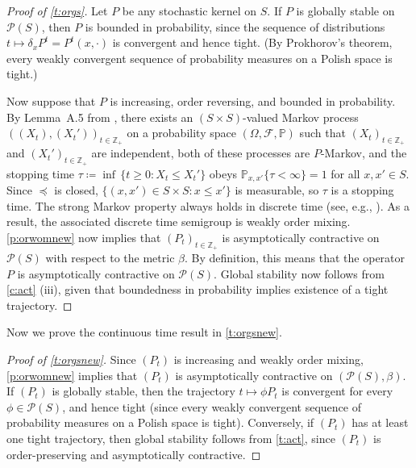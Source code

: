 \documentclass[12pt,reqno]{amsart}
\numberwithin{equation}{section}
\theoremstyle{definition}
\newcommand{\1}{\mathbbm{1}}
\newcommand{\ZZ}{\mathbb{Z}}
\newcommand{\PP}{\mathbb P}
\newcommand{\fF}{\mathcal{F}}
\newcommand{\pP}{\mathscr{P}}
\begin{document}
\begin{proof}[Proof of \cref{t:orgs}]
    Let $P$ be any stochastic kernel on $S$.
    If $P$ is globally stable on $\pP(S)$, then $P$ is bounded in probability, 
    since the sequence of distributions $t \mapsto \delta_x P^t = P^t(x, \cdot)$
    is convergent and hence tight. (By Prokhorov's theorem, every weakly convergent sequence of
    probability measures on a Polish space is tight.)

    Now suppose that $P$ is increasing, order reversing, and bounded in
    probability. By Lemma~A.5 from
    \cite{kamihigashi2014stochastic}, there exists
    an $(S \times S)$-valued Markov process $((X_t), (X_t'))_{t \in \ZZ_+}$ on 
    a probability space $(\Omega, \fF, \PP)$ such that 
    $(X_t)_{t \in \ZZ_+}$ and $(X_t')_{t \in \ZZ_+}$ are independent, both of
    these processes are $P$-Markov, and
    the stopping time $\tau \coloneq \inf \, \{t \geq 0 : X_t \leq X_t'\}$
    obeys $\PP_{x,x'} \{ \tau < \infty\} = 1$ for all $x, x' \in S$.
    Since $\preceq$ is closed, $\{(x,x') \in S \times S : x \leq x'\}$ is
    measurable, so $\tau$ is a stopping time.  The strong Markov property always holds
    in discrete time (see, e.g., \cite{meyn2009markov}).  As a result,
    the associated discrete time semigroup is weakly order mixing. 
    \cref{p:orwomnew} now implies that $(P_t)_{t \in \ZZ_+}$
    is asymptotically contractive on $\pP(S)$ with respect to the metric $\beta$.
    By definition, this means that the operator $P$ is asymptotically contractive on $\pP(S)$.
    Global stability now follows from \cref{c:act} (iii), given that
    boundedness in probability implies existence of a tight trajectory.
\end{proof}

Now we prove the continuous time result in \cref{t:orgsnew}.

\begin{proof}[Proof of \cref{t:orgsnew}]
    Since $(P_t)$ is increasing and weakly order mixing, \cref{p:orwomnew}
    implies that $(P_t)$ is asymptotically contractive on $(\pP(S), \beta)$.
    If $(P_t)$ is globally stable, then the trajectory $t \mapsto \phi P_t$
    is convergent for every $\phi \in \pP(S)$, and hence tight (since every
    weakly convergent sequence of probability measures on a Polish space is
    tight).  Conversely, if $(P_t)$ has at least one tight trajectory, then
    global stability follows from \cref{t:act}, since $(P_t)$ is
    order-preserving and asymptotically contractive.
\end{proof}
\end{document}
